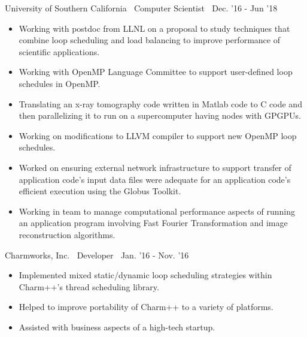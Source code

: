 {University of Southern California$\>$$\>$$\>$$\>$Computer Scientist$\>$$\>$$\>$$\>$Dec. '16 - Jun '18}
\vspace*{-0.0in} 
\begin{itemize}
\item Working with postdoc from LLNL on a proposal to study
techniques that combine loop scheduling and load balancing to improve
performance of scientific applications.
\item Working with OpenMP Language Committee to support user-defined loop schedules in OpenMP.
\item Translating an x-ray tomography code written in
Matlab code to C code and then parallelizing it to run on a supercomputer
having nodes with GPGPUs. 
\item Working on modifications to LLVM compiler to support new
OpenMP loop schedules. 
\item Worked on ensuring external network infrastructure to support transfer of application code's input data files were adequate
for an application code's efficient execution using the Globus Toolkit.
\item Working in team to manage computational performance aspects of running an application program involving Fast Fourier Transformation and image reconstruction algorithms. 
\end{itemize}

{\small Charmworks, Inc.$\>$$\>$$\>$$\>$Developer$\>$$\>$$\>$$\>$Jan. '16 - Nov. '16}
\vspace*{-0.0in}
\begin{itemize}
\item Implemented mixed static/dynamic loop scheduling
strategies within Charm++'s thread scheduling library.
\item Helped to improve portability of Charm++ to a variety of platforms. 
\item Assisted with business aspects of a high-tech startup. 
\end{itemize} 

